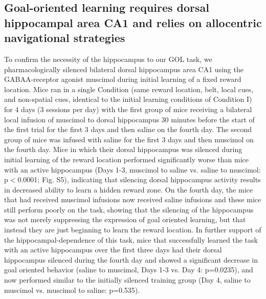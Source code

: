 \subsection{Goal-oriented learning requires dorsal hippocampal area CA1 and relies on allocentric navigational strategies}

To confirm the necessity of the hippocampus to our GOL task, we pharmacologically silenced bilateral dorsal hippocampus area CA1 using the GABAA-receptor agonist muscimol during initial learning of a fixed reward location. Mice ran in a single Condition (same reward location, belt, local cues, and non-spatial cues, identical to the initial learning conditions of Condition I) for 4 days (3 sessions per day) with the first group of mice receiving a bilateral local infusion of muscimol to dorsal hippocampus 30 minutes before the start of the first trial for the first 3 days and then saline on the fourth day. The second group of mice was infused with saline for the first 3 days and then muscimol on the fourth day. Mice in which their dorsal hippocampus was silenced during initial learning of the reward location performed significantly worse than mice with an active hippocampus (Days 1-3, muscimol to saline vs. saline to muscimol: p$<$0.0001; Fig. S5), indicating that silencing dorsal hippocampus activity results in decreased ability to learn a hidden reward zone. On the fourth day, the mice that had received muscimol infusions now received saline infusions and these mice still perform poorly on the task, showing that the silencing of the hippocampus was not merely suppressing the expression of goal oriented learning, but that instead they are just beginning to learn the reward location. In further support of the hippocampal-dependence of this task, mice that successfully learned the task with an active hippocampus over the first three days had their dorsal hippocampus silenced during the fourth day and showed a significant decrease in goal oriented behavior (saline to muscimol, Days 1-3 vs. Day 4: p=0.0235), and now performed similar to the initially silenced training group (Day 4, saline to muscimol vs. muscimol to saline: p=0.535).

